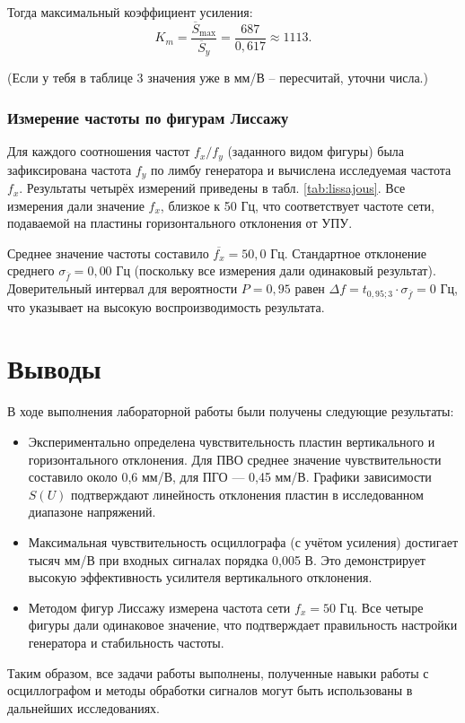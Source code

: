 Тогда максимальный коэффициент усиления:
\[
K_m = \frac{\overline{S}_{\text{max}}}{\overline{S}_y} = \frac{687}{0,617} \approx 1113.
\]

(Если у тебя в таблице 3 значения уже в мм/В – пересчитай, уточни числа.)

\subsubsection{Измерение частоты по фигурам Лиссажу}

Для каждого соотношения частот \(f_x/f_y\) (заданного видом фигуры) была зафиксирована частота \(f_y\) по лимбу генератора и вычислена исследуемая частота \(f_x\). Результаты четырёх измерений приведены в табл. \ref{tab:lissajous}. Все измерения дали значение \(f_x\), близкое к 50 Гц, что соответствует частоте сети, подаваемой на пластины горизонтального отклонения от УПУ.



Среднее значение частоты составило \(\overline{f_x} = 50,0\) Гц. Стандартное отклонение среднего \(\sigma_{\overline{f}} = 0,00\) Гц (поскольку все измерения дали одинаковый результат). Доверительный интервал для вероятности \(P = 0,95\) равен \(\Delta f = t_{0,95;3} \cdot \sigma_{\overline{f}} = 0\) Гц, что указывает на высокую воспроизводимость результата.

\section{Выводы}

В ходе выполнения лабораторной работы были получены следующие результаты:

\begin{itemize}
    \item Экспериментально определена чувствительность пластин вертикального и горизонтального отклонения. Для ПВО среднее значение чувствительности составило около 0,6 мм/В, для ПГО — 0,45 мм/В. Графики зависимости \(S(U)\) подтверждают линейность отклонения пластин в исследованном диапазоне напряжений.
    \item Максимальная чувствительность осциллографа (с учётом усиления) достигает тысяч мм/В при входных сигналах порядка 0,005 В. Это демонстрирует высокую эффективность усилителя вертикального отклонения.
    \item Методом фигур Лиссажу измерена частота сети \(f_x = 50\) Гц. Все четыре фигуры дали одинаковое значение, что подтверждает правильность настройки генератора и стабильность частоты.
\end{itemize}

Таким образом, все задачи работы выполнены, полученные навыки работы с осциллографом и методы обработки сигналов могут быть использованы в дальнейших исследованиях.